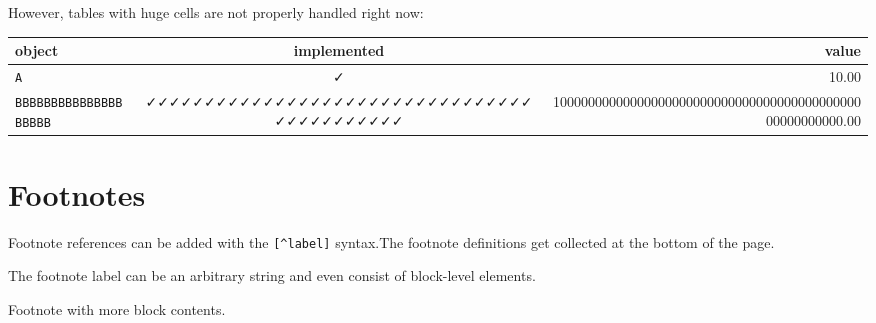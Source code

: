 However, tables with huge cells are not properly handled right now:




\begin{table}[h]
\centering
\begin{tabulary}{\linewidth}{L C R}
\toprule
object & implemented & value \\
\toprule
\texttt{A} & ✓ & 10.00 \\
\texttt{BBBBBBBBBBBBBBBBBBBB} & ✓✓✓✓✓✓✓✓✓✓✓✓✓✓✓✓✓✓✓✓✓✓✓✓✓✓✓✓✓✓✓✓✓✓✓✓✓✓✓✓✓✓✓✓ & 1000000000000000000000000000000000000000000000000000000.00 \\
\bottomrule
\end{tabulary}

\end{table}



\section{Footnotes}



\label{1016741409465595347}{}


Footnote references can be added with the \texttt{[{\textasciicircum}label]} syntax.\footnotemark[1] The footnote definitions get collected at the bottom of the page.



The footnote label can be an arbitrary string and even consist of block-level elements.\footnotemark[2]







Footnote with more block contents.\footnotemark[3]






